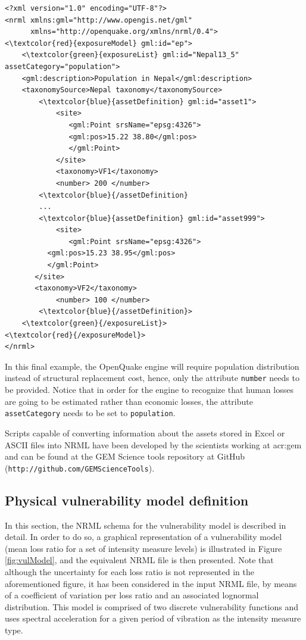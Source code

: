 \begin{Verbatim}[frame=single, commandchars=\\\{\}, samepage=false]
<?xml version="1.0" encoding="UTF-8"?>
<nrml xmlns:gml="http://www.opengis.net/gml"
      xmlns="http://openquake.org/xmlns/nrml/0.4">
<\textcolor{red}{exposureModel} gml:id="ep">
    <\textcolor{green}{exposureList} gml:id="Nepal13_5" assetCategory="population">
    <gml:description>Population in Nepal</gml:description>
    <taxonomySource>Nepal taxonomy</taxonomySource>
        <\textcolor{blue}{assetDefinition} gml:id="asset1">
            <site>
               <gml:Point srsName="epsg:4326">
               <gml:pos>15.22 38.80</gml:pos>
               </gml:Point>
            </site>
            <taxonomy>VF1</taxonomy>
            <number> 200 </number>
        <\textcolor{blue}{/assetDefinition} 
        ...
        <\textcolor{blue}{assetDefinition} gml:id="asset999">
            <site>
               <gml:Point srsName="epsg:4326">
	      <gml:pos>15.23 38.95</gml:pos>
	      </gml:Point>
	   </site>
	   <taxonomy>VF2</taxonomy>
            <number> 100 </number>
        <\textcolor{blue}{/assetDefinition}> 
    <\textcolor{green}{/exposureList}>
<\textcolor{red}{/exposureModel}>
</nrml>
\end{Verbatim}

In this final example, the OpenQuake engine will require population distribution instead of structural replacement cost, hence, only the attribute \Verb+number+ needs to be provided. Notice that in order for the engine to recognize that human losses are going to be estimated rather than economic losses, the attribute \Verb+assetCategory+ needs to be set to  \Verb+population+.  
 
Scripts capable of converting information about the assets stored in Excel or ASCII files into NRML have been developed by the scientists working at \gls{acr:gem} and can be found at the GEM Science tools repository at GitHub (\textcolor{blue01}{\Verb+http://github.com/GEMScienceTools+}). 

\subsection{Physical vulnerability model definition}
In this section, the NRML schema for the \gls{vulnerability model} is described in detail. In order to do so, a graphical representation of a \gls{vulnerability model} (mean loss ratio for a set of intensity measure levels) is illustrated in Figure \ref{fig:vulModel}, and the equivalent NRML file is then presented. Note that although the uncertainty for each loss ratio is not represented in the aforementioned figure, it has been considered in the input NRML file, by means of a coefficient of variation per loss ratio and an associated lognormal distribution. This model is comprised of two discrete \glspl{vulnerability function} and uses spectral acceleration for a given period of vibration as the intensity measure type. 

